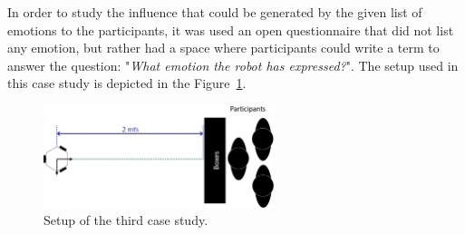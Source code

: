 In order to study the influence that could be generated by the given list of emotions to the participants, it was used an open questionnaire that did not list any emotion, but rather had a space where participants could write a term to answer the question: "\textit{What emotion the robot has expressed?}".
The setup used in this case study is depicted in the Figure~\ref{fig:setup2}.
\begin{figure}
	\centering
	\includegraphics[width=0.6\textwidth]{./Images/ThirdCase.png} 
	\caption{Setup of the third case study.}
	\label{fig:setup2} %
\end{figure}
